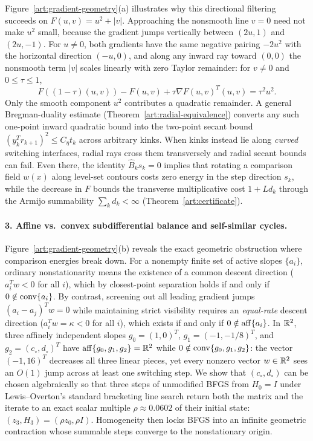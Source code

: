 Figure~\ref{art:gradient-geometry}(a) illustrates why this directional filtering
succeeds on $F(u,v)=u^2+|v|$. Approaching the nonsmooth line $v=0$ need not
make $u^2$ small, because the gradient jumps vertically between $(2u,1)$ and
$(2u,-1)$. For $u\ne0$, both gradients have the same negative pairing $-2u^2$
with the horizontal direction $(-u,0)$, and along any inward ray toward $(0,0)$
the nonsmooth term $|v|$ scales linearly with zero Taylor remainder: for $v\ne0$
and $0\le\tau\le1$,
\begin{equation}\label{art:mixed-inward-remainder}
 F((1-\tau)(u,v))-F(u,v)+\tau\nabla F(u,v)^T(u,v)=\tau^2u^2.
\end{equation}
Only the smooth component $u^2$ contributes a quadratic remainder. A general
Bregman-duality estimate (Theorem~\ref{art:radial-equivalence}) converts any
such one-point inward quadratic bound into the two-point secant bound
$(y_k^Tr_{k+1})^2\le C_\eta t_k$ across arbitrary kinks. When kinks instead lie
along \emph{curved} switching interfaces, radial rays cross them transversely
and radial secant bounds can fail. Even there, the identity
$\widehat B_ks_k=0$ implies that rotating a comparison field $w(x)$ along
level-set contours costs zero energy in the step direction $s_k$, while the
decrease in $F$ bounds the transverse multiplicative cost $1+Ld_k$ through the
Armijo summability $\sum_kd_k<\infty$ (Theorem~\ref{art:certificate}).

\paragraph{3. Affine vs.\ convex subdifferential balance and self-similar cycles.}
Figure~\ref{art:gradient-geometry}(b) reveals the exact geometric obstruction
where comparison energies break down. For a nonempty finite set of active
slopes $\{a_i\}$, ordinary nonstationarity means the existence of a common
descent direction ($a_i^Tw<0$ for all $i$), which by closest-point separation
holds if and only if $0\notin\operatorname{conv}\{a_i\}$. By contrast, screening out all
leading gradient jumps $(a_i-a_j)^Tw=0$ while maintaining strict visibility
requires an \emph{equal-rate} descent direction ($a_i^Tw=\kappa<0$ for all $i$),
which exists if and only if $0\notin\operatorname{aff}\{a_i\}$. In $\mathbb R^2$, three affinely
independent slopes $g_0=(1,0)^T$, $g_1=(-1,-1/8)^T$, and $g_2=(c_\circ,d_\circ)^T$
have $\operatorname{aff}\{g_0,g_1,g_2\}=\mathbb R^2$ while $0\notin\operatorname{conv}\{g_0,g_1,g_2\}$: the vector
$(-1,16)^T$ decreases all three linear pieces, yet every nonzero vector
$w\in\mathbb R^2$ sees an $O(1)$ jump across at least one switching step. We show that
$(c_\circ,d_\circ)$ can be chosen algebraically so that three steps of unmodified
BFGS from $H_0=I$ under Lewis--Overton's standard bracketing line search return
both the matrix and the iterate to an exact scalar multiple $\rho\approx0.0602$
of their initial state: $(z_3,H_3)=(\rho z_0,\rho I)$. Homogeneity then locks
BFGS into an infinite geometric contraction whose summable steps converge to the
nonstationary origin.

